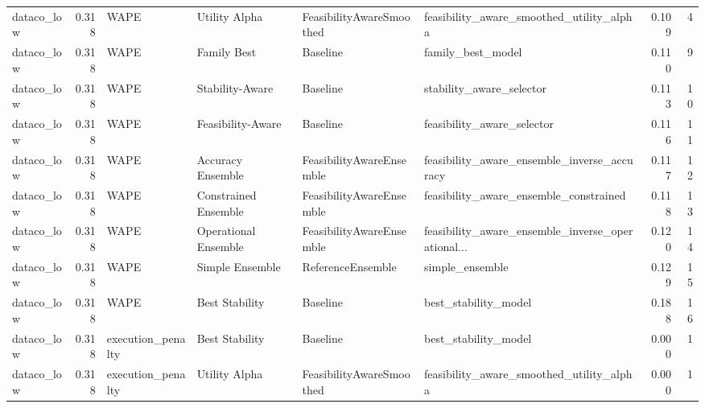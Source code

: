 \begin{table}
{\begin{tabular}{lrllllrr}
    dataco\_low &             0.318 &                        WAPE &         Utility Alpha &  FeasibilityAwareSmoothed &           feasibility\_aware\_smoothed\_utility\_alpha &         0.109 &               4 \\
    dataco\_low &             0.318 &                        WAPE &           Family Best &                  Baseline &                                  family\_best\_model &         0.110 &               9 \\
    dataco\_low &             0.318 &                        WAPE &       Stability-Aware &                  Baseline &                           stability\_aware\_selector &         0.113 &              10 \\
    dataco\_low &             0.318 &                        WAPE &     Feasibility-Aware &                  Baseline &                         feasibility\_aware\_selector &         0.116 &              11 \\
    dataco\_low &             0.318 &                        WAPE &     Accuracy Ensemble &  FeasibilityAwareEnsemble &        feasibility\_aware\_ensemble\_inverse\_accuracy &         0.117 &              12 \\
    dataco\_low &             0.318 &                        WAPE &  Constrained Ensemble &  FeasibilityAwareEnsemble &             feasibility\_aware\_ensemble\_constrained &         0.118 &              13 \\
    dataco\_low &             0.318 &                        WAPE &  Operational Ensemble &  FeasibilityAwareEnsemble &  feasibility\_aware\_ensemble\_inverse\_operational... &         0.120 &              14 \\
    dataco\_low &             0.318 &                        WAPE &       Simple Ensemble &         ReferenceEnsemble &                                    simple\_ensemble &         0.129 &              15 \\
    dataco\_low &             0.318 &                        WAPE &        Best Stability &                  Baseline &                               best\_stability\_model &         0.188 &              16 \\
    dataco\_low &             0.318 &           execution\_penalty &        Best Stability &                  Baseline &                               best\_stability\_model &         0.000 &               1 \\
    dataco\_low &             0.318 &           execution\_penalty &         Utility Alpha &  FeasibilityAwareSmoothed &           feasibility\_aware\_smoothed\_utility\_alpha &         0.000 &               1 \\

\end{tabular}}
\end{table}
